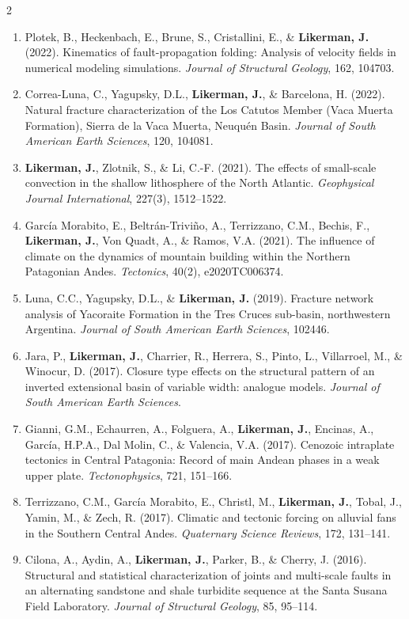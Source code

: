 \documentclass[10pt,a4paper]{../awesome-cv}
\begin{document}
{\begin{multicols}{2}
\begin{enumerate}
  \item Plotek, B., Heckenbach, E., Brune, S., Cristallini, E., \& \textbf{Likerman, J.} (2022). Kinematics of fault-propagation folding: Analysis of velocity fields in numerical modeling simulations. \emph{Journal of Structural Geology}, 162, 104703.
  \item Correa-Luna, C., Yagupsky, D.L., \textbf{Likerman, J.}, \& Barcelona, H. (2022). Natural fracture characterization of the Los Catutos Member (Vaca Muerta Formation), Sierra de la Vaca Muerta, Neuquén Basin. \emph{Journal of South American Earth Sciences}, 120, 104081.
  \item \textbf{Likerman, J.}, Zlotnik, S., \& Li, C.-F. (2021). The effects of small-scale convection in the shallow lithosphere of the North Atlantic. \emph{Geophysical Journal International}, 227(3), 1512--1522.
  \item García Morabito, E., Beltrán-Triviño, A., Terrizzano, C.M., Bechis, F., \textbf{Likerman, J.}, Von Quadt, A., \& Ramos, V.A. (2021). The influence of climate on the dynamics of mountain building within the Northern Patagonian Andes. \emph{Tectonics}, 40(2), e2020TC006374.
  \item Luna, C.C., Yagupsky, D.L., \& \textbf{Likerman, J.} (2019). Fracture network analysis of Yacoraite Formation in the Tres Cruces sub-basin, northwestern Argentina. \emph{Journal of South American Earth Sciences}, 102446.
  \item Jara, P., \textbf{Likerman, J.}, Charrier, R., Herrera, S., Pinto, L., Villarroel, M., \& Winocur, D. (2017). Closure type effects on the structural pattern of an inverted extensional basin of variable width: analogue models. \emph{Journal of South American Earth Sciences}.
  \item Gianni, G.M., Echaurren, A., Folguera, A., \textbf{Likerman, J.}, Encinas, A., García, H.P.A., Dal Molin, C., \& Valencia, V.A. (2017). Cenozoic intraplate tectonics in Central Patagonia: Record of main Andean phases in a weak upper plate. \emph{Tectonophysics}, 721, 151--166.
  \item Terrizzano, C.M., García Morabito, E., Christl, M., \textbf{Likerman, J.}, Tobal, J., Yamin, M., \& Zech, R. (2017). Climatic and tectonic forcing on alluvial fans in the Southern Central Andes. \emph{Quaternary Science Reviews}, 172, 131--141.
  \item Cilona, A., Aydin, A., \textbf{Likerman, J.}, Parker, B., \& Cherry, J. (2016). Structural and statistical characterization of joints and multi-scale faults in an alternating sandstone and shale turbidite sequence at the Santa Susana Field Laboratory. \emph{Journal of Structural Geology}, 85, 95--114.

\end{enumerate}
\end{multicols}}
\end{document}
